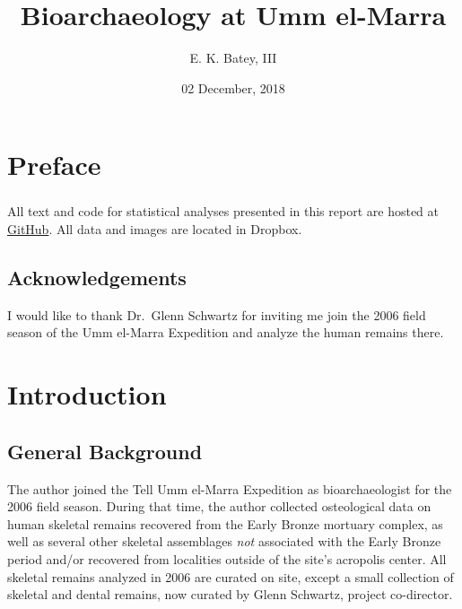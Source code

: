 \documentclass[]{book}
\title{Bioarchaeology at Umm el-Marra}
\author{E. K. Batey, III}
\date{02 December, 2018}
\begin{document}
\maketitle

{
\setcounter{tocdepth}{1}
\tableofcontents
}
\chapter*{Preface}\label{preface}

\subsection{}\label{section}

\subsection{}\label{section-1}

All text and code for statistical analyses presented in this report are
hosted at \href{https://www.github.com/bateyt/elmarra-bioarch}{GitHub}.
All data and images are located in Dropbox.

\section*{Acknowledgements}\label{acknowledgements}

I would like to thank Dr.~Glenn Schwartz for inviting me join the 2006
field season of the Umm el-Marra Expedition and analyze the human
remains there.

\chapter{Introduction}\label{intro}

\section{General Background}\label{general-background}

The author joined the Tell Umm el-Marra Expedition as bioarchaeologist
for the 2006 field season. During that time, the author collected
osteological data on human skeletal remains recovered from the Early
Bronze mortuary complex, as well as several other skeletal assemblages
\emph{not} associated with the Early Bronze period and/or recovered from
localities outside of the site's acropolis center. All skeletal remains
analyzed in 2006 are curated on site, except a small collection of
skeletal and dental remains, now curated by Glenn Schwartz, project
co-director.
\end{document}
